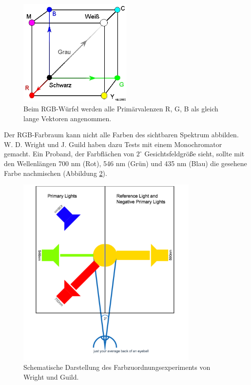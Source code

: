 \begin{figure}[H]     %
\centering
\includegraphics[width=0.5\textwidth]{bilder/rgb1} 
\caption {Beim RGB-Würfel werden alle Primärvalenzen R, G, B als gleich lange Vektoren angenommen.\protect\footnotemark}\label{b_rgb1}
\end{figure}
 
\noindent Der RGB-Farbraum kann nicht alle Farben des sichtbaren Spektrum abbilden. W. D. Wright und J. Guild haben dazu Tests mit einem Monochromator gemacht. Ein Proband, der Farbflächen von $2^\circ$ Gesichtsfeldgröße sieht, sollte mit den Wellenlängen 700 nm (Rot), 546 nm (Grün) und 435 nm (Blau) die gesehene Farbe nachmischen (Abbildung \ref{b_rgb2}).

\begin{figure}[H]     %
\centering
\includegraphics[width=0.8\textwidth]{bilder/rgb2} 
\caption {Schematische Darstellung des Farbzuordnungsexperiments von Wright und Guild.\protect\footnotemark}\label{b_rgb2}
\end{figure}

